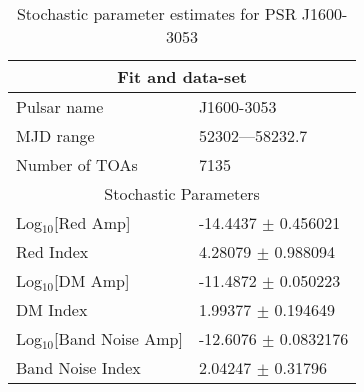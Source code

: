 \documentclass{article}
\begin{document}
\begin{table*}
\caption{Stochastic parameter estimates for PSR J1600-3053}
\begin{tabular}{ll}
\hline\hline
\multicolumn{2}{c}{Fit and data-set} \\ 
\hline
Pulsar name\dotfill & J1600-3053 \\ 
MJD range\dotfill & 52302---58232.7 \\ 
Number of TOAs\dotfill & 7135 \\
\hline
\multicolumn{2}{c}{Stochastic Parameters} \\ 
\hline
Log$_{10}$[Red Amp] \dotfill & -14.4437 $\pm$ 0.456021  \\ 
Red Index \dotfill & 4.28079 $\pm$ 0.988094  \\ 
Log$_{10}$[DM Amp] \dotfill & -11.4872 $\pm$ 0.050223  \\ 
DM Index \dotfill & 1.99377 $\pm$ 0.194649  \\ 
Log$_{10}$[Band Noise Amp] \dotfill & -12.6076 $\pm$ 0.0832176  \\ 
Band Noise Index \dotfill & 2.04247 $\pm$ 0.31796  \\ 
\hline
\end{tabular}
\label{Table:J1600-3053}
\end{table*} 
\end{document}
